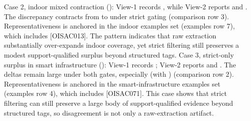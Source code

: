 {}Case 2, indoor mixed contraction (): View-1 records , while View-2 reports  and . The discrepancy contracts from  to  under strict gating (comparison row \markdownRendererHash{}3). Representativeness is anchored in the indoor  examples set (examples row \markdownRendererHash{}7), which includes  [O\markdownRendererUnderscore{}ISAC\markdownRendererUnderscore{}013]. The pattern indicates that raw extraction substantially over-expands indoor coverage, yet strict filtering still preserves a modest support-qualified surplus beyond structured tags.\markdownRendererParagraphSeparator
{}Case 3, strict-only surplus in smart infrastructure (): View-1 records ; View-2 reports  and . The deltas remain large under both gates, especially  (with ) (comparison row \markdownRendererHash{}2). Representativeness is anchored in the smart-infrastructure  examples set (examples row \markdownRendererHash{}4), which includes  [O\markdownRendererUnderscore{}ISAC\markdownRendererUnderscore{}071]. This case shows that strict filtering can still preserve a large body of support-qualified evidence beyond structured tags, so disagreement is not only a raw-extraction artifact.\markdownRendererParagraphSeparator
